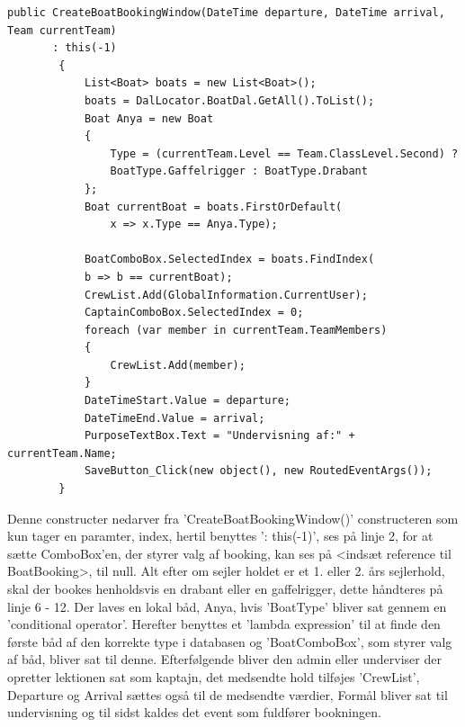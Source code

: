 \begin{lstlisting}[caption={Dette kode bliver indirekte udført når der trykkes på 'OK' knappen, og opretter en bådreservation for lektionen.},
label=IndirekteBook]
public CreateBoatBookingWindow(DateTime departure, DateTime arrival, Team currentTeam) 
	   : this(-1)
        {
            List<Boat> boats = new List<Boat>();
            boats = DalLocator.BoatDal.GetAll().ToList();
            Boat Anya = new Boat
            {
                Type = (currentTeam.Level == Team.ClassLevel.Second) ?
                BoatType.Gaffelrigger : BoatType.Drabant
            };
            Boat currentBoat = boats.FirstOrDefault(
                x => x.Type == Anya.Type);

            BoatComboBox.SelectedIndex = boats.FindIndex(
            b => b == currentBoat);
            CrewList.Add(GlobalInformation.CurrentUser);
            CaptainComboBox.SelectedIndex = 0;
            foreach (var member in currentTeam.TeamMembers)
            {
                CrewList.Add(member);
            }
            DateTimeStart.Value = departure;
            DateTimeEnd.Value = arrival;
            PurposeTextBox.Text = "Undervisning af:" + currentTeam.Name;
            SaveButton_Click(new object(), new RoutedEventArgs());
        }
\end{lstlisting}
Denne constructer nedarver fra 'CreateBoatBookingWindow()' constructeren som kun tager en paramter, index, hertil benyttes ': this(-1)', ses på linje 2, for at sætte ComboBox'en, der styrer valg af booking, kan ses på <indsæt reference til BoatBooking>, til null.
Alt efter om sejler holdet er et 1. eller 2. års sejlerhold, skal der bookes henholdsvis en drabant eller en gaffelrigger, dette håndteres på linje 6 - 12. Der laves en lokal båd, Anya, hvis 'BoatType' bliver sat gennem en 'conditional operator'.
Herefter benyttes et 'lambda expression' til at finde den første båd af den korrekte type i databasen og 'BoatComboBox', som styrer valg af båd, bliver sat til denne.
Efterfølgende bliver den admin eller underviser der opretter lektionen sat som kaptajn, det medsendte hold tilføjes 'CrewList', Departure og Arrival sættes også til de medsendte værdier, Formål bliver sat til undervisning og til sidst kaldes det event som fuldfører bookningen.

